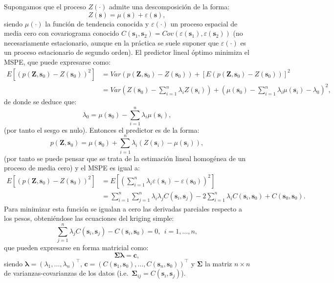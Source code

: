 \documentclass[
  spanish,
]{book}
\theoremstyle{break}
\theoremstyle{definition}
\theoremstyle{definition}
\theoremstyle{definition}
\theoremstyle{definition}
\theoremstyle{remark}
\begin{document}
Supongamos que el proceso \(Z(\cdot)\) admite una descomposición de la forma:
\[Z(\mathbf{s})=\mu(\mathbf{s})+\varepsilon(\mathbf{s}),\]
siendo \(\mu(\cdot)\) la función de tendencia conocida y \(\varepsilon(\cdot)\) un proceso espacial de media cero con covariograma conocido \(C(\mathbf{s}_{1}, \mathbf{s}_{2}) =Cov(\varepsilon(\mathbf{s}_{1}), \varepsilon(\mathbf{s}_{2}))\) (no necesariamente estacionario, aunque en la práctica se suele suponer que \(\varepsilon(\cdot)\) es un proceso estacionario de segundo orden).
El predictor lineal óptimo minimiza el MSPE, que puede expresarse como:
\[\begin{aligned}
E\left[ \left( p(\mathbf{Z},\mathbf{s}_{0}) - Z(\mathbf{s}_{0})\right)^2 \right]  
& = Var\left( p(\mathbf{Z},\mathbf{s}_{0}) - Z(\mathbf{s}_{0})\right) 
+ \left[ E\left( p(\mathbf{Z},\mathbf{s}_{0}) - Z(\mathbf{s}_{0})\right) \right]^{2}  \\
& = Var\left( Z(\mathbf{s}_{0})-\sum\limits_{i=1}^{n}\lambda_{i}
Z(\mathbf{s}_{i}) \right) +\left( \mu(\mathbf{s}_{0}
)-\sum\limits_{i=1}^{n}\lambda_{i} \mu(\mathbf{s}_{i}) -\lambda_{0}
\right)^{2},
\end{aligned}\]
de donde se deduce que:
\[\lambda_{0} =\mu(\mathbf{s}_{0})-\sum\limits_{i=1}^{n}\lambda_{i} \mu(\mathbf{s}_{i}),\]
(por tanto el sesgo es nulo).
Entonces el predictor es de la forma:
\[p(\mathbf{Z}, \mathbf{s}_{0}) = \mu(\mathbf{s}_{0}) + \sum\limits_{i=1}^{n}\lambda_{i} (Z(\mathbf{s}_{i}) -\mu(\mathbf{s}_{i})),\]
(por tanto se puede pensar que se trata de la estimación lineal homogénea de un proceso de media cero) y el MSPE es igual a:
\[\begin{aligned}
E\left[ \left( p(\mathbf{Z},\mathbf{s}_{0})-Z(\mathbf{s}_{0})\right)^2 \right]  & = E\left[ \left( \sum\limits_{i=1}^{n}\lambda_{i} \varepsilon(\mathbf{s}_{i}) -\varepsilon(\mathbf{s}_{0})\right)^2 \right]  \\
& = \sum\limits_{i=1}^{n}\sum\limits_{j=1}^{n}\lambda_{i} \lambda_{j}
C(\mathbf{s}_{i},\mathbf{s}_{j} ) -2 \sum\limits_{i=1}^{n}\lambda_{i}
C(\mathbf{s}_{i},\mathbf{s}_{0}) +C(\mathbf{s}_{0},\mathbf{s}_{0}).\end{aligned}\]
Para minimizar esta función se igualan a cero las derivadas parciales respecto a los pesos, obteniéndose las ecuaciones del kriging simple:
\[\sum\limits_{j=1}^{n}\lambda_{j} C(\mathbf{s}_{i},\mathbf{s}_{j} )
- C(\mathbf{s}_{i},\mathbf{s}_{0})=0, \ \
i=1, \ldots, n,\]
que pueden expresarse en forma matricial como:
\[\boldsymbol{\Sigma}\boldsymbol{\lambda}=\mathbf{c},\]
siendo \(\boldsymbol{\lambda} = \left(\lambda_{1}, \ldots, \lambda_{n}\right)^\top\), \(\mathbf{c}=\left( C(\mathbf{s}_{1},\mathbf{s}_{0}), \ldots,C(\mathbf{s}_{n}, \mathbf{s}_{0})\right)^\top\) y \(\boldsymbol{\Sigma}\) la matriz \(n\times n\) de varianzas-covarianzas de los datos (i.e.~\(\boldsymbol{\Sigma}_{ij} =C(\mathbf{s}_{i},\mathbf{s}_{j} )\)).
\end{document}

